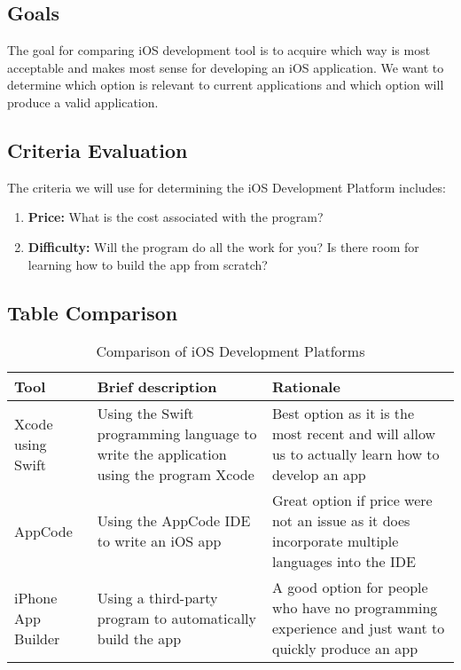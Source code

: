 \documentclass[letterpaper,10pt,draftclsnofoot,onecolumn,titlepage]{IEEEtran}
\begin{document}
	\subsection{Goals}
	The goal for comparing iOS development tool is to acquire which way is most acceptable and makes most sense for developing an iOS application.
	We want to determine which option is relevant to current applications and which option will produce a valid application.
	\subsection{Criteria Evaluation}
	The criteria we will use for determining the iOS Development Platform includes:
		\begin{enumerate}
			\item \textbf{Price:} What is the cost associated with the program?
			\item \textbf{Difficulty:} Will the program do all the work for you? Is there room for learning how to build the app from scratch?
		\end{enumerate}
	\subsection{Table Comparison}

	\begin{table}[ht]
	\caption{Comparison of iOS Development Platforms}
	\begin{center}
	\begin{tabular} { | m{3cm} | m{5cm} | m{5cm} | }
	\hline\hline
	Tool & Brief description & Rationale \\ [0.5ex]
	\hline
	Xcode using Swift & Using the Swift programming language to write the application using the program Xcode & Best option as it is the most recent and will allow us to actually learn how to develop an app \\
	\hline
	AppCode & Using the AppCode IDE to write an iOS app & Great option if price were not an issue as it does incorporate multiple languages into the IDE \\
	\hline
	iPhone App Builder & Using a third-party program to automatically build the app & A good option for people who have no programming experience and just want to quickly produce an app \\
	\hline
	\end{tabular}
	\end{center}
	\end{table}
\end{document}
